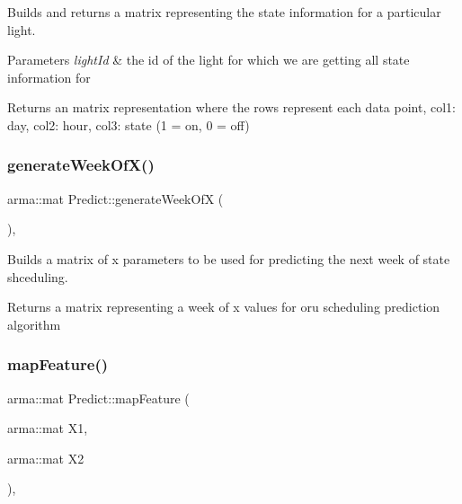 Builds and returns a matrix representing the state information for a particular light.


\begin{DoxyParams}{Parameters}
{\em light\+Id} & the id of the light for which we are getting all state information for \\
\hline
\end{DoxyParams}
\begin{DoxyReturn}{Returns}
an matrix representation where the rows represent each data point, col1\+: day, col2\+: hour, col3\+: state (1 = on, 0 = off) 
\end{DoxyReturn}
\mbox{\label{class_predict_a4841c8dca153dbc59ecaccec41686109}} 
\subsubsection{\texorpdfstring{generate\+Week\+Of\+X()}{generateWeekOfX()}}
{\footnotesize\ttfamily arma\+::mat Predict\+::generate\+Week\+OfX (\begin{DoxyParamCaption}{ }\end{DoxyParamCaption})\hspace{0.3cm}{\ttfamily [static]}, {\ttfamily [private]}}

Builds a matrix of x parameters to be used for predicting the next week of state shceduling.

\begin{DoxyReturn}{Returns}
a matrix representing a week of x values for oru scheduling prediction algorithm 
\end{DoxyReturn}
\mbox{\label{class_predict_a8c922a17b4f5b2f17e92cc6c4e5b0e44}} 
\subsubsection{\texorpdfstring{map\+Feature()}{mapFeature()}}
{\footnotesize\ttfamily arma\+::mat Predict\+::map\+Feature (\begin{DoxyParamCaption}\item[{arma\+::mat}]{X1,  }\item[{arma\+::mat}]{X2 }\end{DoxyParamCaption})\hspace{0.3cm}{\ttfamily [static]}, {\ttfamily [private]}}

